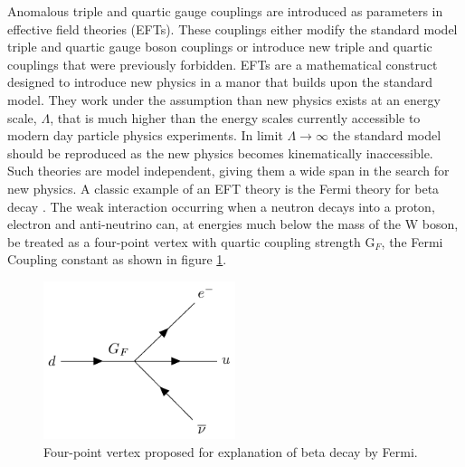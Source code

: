 Anomalous triple and quartic gauge couplings are introduced as parameters in effective field theories (EFTs).  These couplings either modify the standard model triple and quartic gauge boson couplings or introduce new triple and quartic couplings that were previously forbidden.  EFTs are a mathematical construct designed to introduce new physics in a manor that builds upon the standard model.  They work under the assumption than new physics exists at an energy scale, $\Lambda$, that is much higher than the energy scales currently accessible to modern day particle physics experiments.  In limit $\Lambda \rightarrow \infty$ the standard model should be reproduced as the new physics becomes kinematically inaccessible.  Such theories are model independent, giving them a wide span in the search for new physics.  A classic example of an EFT theory is the Fermi theory for beta decay \cite{Fermi:1934hr}.  The weak interaction occurring when a neutron decays into a proton, electron and anti-neutrino can, at energies much below the mass of the W boson, be treated as a four-point vertex with quartic coupling strength $\text{G}_{F}$, the Fermi Coupling constant as shown in figure \ref{fig:fermitheory}.

\begin{figure}[h!]
\includegraphics[width=0.5\textwidth]{PhysicsAnalysis/Plots/FeynmanDiagrams/FermiTheory.pdf}
\caption[Four-point vertex proposed for explanation of beta decay by Fermi.]{Four-point vertex proposed for explanation of beta decay by Fermi.} 
\label{fig:fermitheory}
\end{figure}

